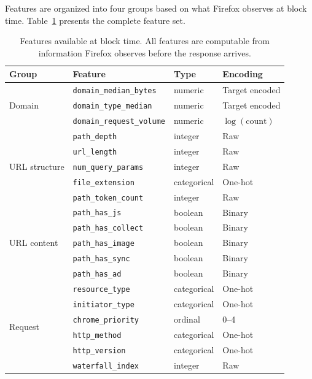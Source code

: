 \documentclass[11pt]{article}
\begin{document}
Features are organized into four groups based on what Firefox observes at block time. Table~\ref{tab:features} presents the complete feature set.

\begin{table}[h]
\centering
\small
\begin{tabular}{llll}
\toprule
Group & Feature & Type & Encoding \\
\midrule
\multirow{3}{*}{Domain} & \texttt{domain\_median\_bytes} & numeric & Target encoded \\
 & \texttt{domain\_type\_median} & numeric & Target encoded \\
 & \texttt{domain\_request\_volume} & numeric & $\log(\text{count})$ \\
\midrule
\multirow{5}{*}{URL structure} & \texttt{path\_depth} & integer & Raw \\
 & \texttt{url\_length} & integer & Raw \\
 & \texttt{num\_query\_params} & integer & Raw \\
 & \texttt{file\_extension} & categorical & One-hot \\
 & \texttt{path\_token\_count} & integer & Raw \\
\midrule
\multirow{5}{*}{URL content} & \texttt{path\_has\_js} & boolean & Binary \\
 & \texttt{path\_has\_collect} & boolean & Binary \\
 & \texttt{path\_has\_image} & boolean & Binary \\
 & \texttt{path\_has\_sync} & boolean & Binary \\
 & \texttt{path\_has\_ad} & boolean & Binary \\
\midrule
\multirow{6}{*}{Request} & \texttt{resource\_type} & categorical & One-hot \\
 & \texttt{initiator\_type} & categorical & One-hot \\
 & \texttt{chrome\_priority} & ordinal & 0--4 \\
 & \texttt{http\_method} & categorical & One-hot \\
 & \texttt{http\_version} & categorical & One-hot \\
 & \texttt{waterfall\_index} & integer & Raw \\
\bottomrule
\end{tabular}
\caption{Features available at block time. All features are computable from information Firefox observes before the response arrives.}
\label{tab:features}
\end{table}
\end{document}
